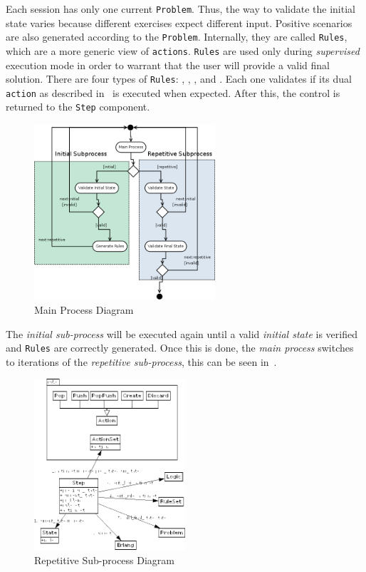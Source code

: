 Each session has only one current \texttt{Problem}. Thus, the way to
validate the initial state varies because different exercises expect
different input. Positive scenarios are also generated according to
the \texttt{Problem}. Internally, they are called \texttt{Rules},
which are a more generic view of \texttt{actions}. \texttt{Rules} are
used only during \emph{supervised} execution mode in order to warrant
that the user will provide a valid final solution. There are four
types of \texttt{Rules}: \pop, \push, \poppush, \create and \discard.
Each one validates if its dual \texttt{action} as described
in~ is executed when expected. After this, the
control is returned to the \texttt{Step} component.

\begin{figure}[t]
  \centering
  \includegraphics[width=0.6\textwidth]{img/diagrams/main.png}
  \caption{Main Process Diagram}
  \label{fig:dia:main}
\end{figure}

The \emph{initial sub\hyp{}process} will be executed again until a
valid \emph{initial state} is verified and \texttt{Rules} are
correctly generated. Once this is done, the \emph{main process}
switches to iterations of the \emph{repetitive sub\hyp{}process}, this
can be seen in~.

\begin{figure}[!b]
  \centering
  \includegraphics[width=0.5\textwidth]{img/diagrams/repetitive.png}
  \caption{Repetitive Sub\hyp{}process Diagram}
  \label{fig:dia:repetitive}
\end{figure}

